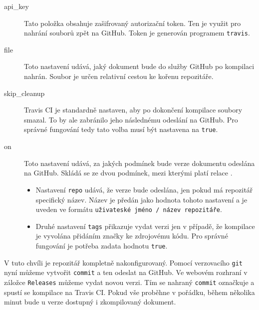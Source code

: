 \documentclass[a4paper]{article}
\begin{document}
\begin{description}
    \item[api\_key] Tato položka obsahuje zašifrovaný autorizační token.
    Ten je využit pro nahrání souborů zpět na GitHub.
    Token je generován programem \texttt{travis}.

    \item[file] Toto nastavení udává, jaký dokument bude do služby GitHub po kompilaci nahrán.
    Soubor je určen relativní cestou ke kořenu repozitáře.

    \item[skip\_cleanup] Travis CI je standardně nastaven, aby po dokončení kompilace soubory smazal.
    To by ale zabránilo jeho následnému odeslání na GitHub.
    Pro správné fungování tedy tato volba musí být nastavena na \texttt{true}.

    \item[on] Toto nastavení udává, za jakých podmínek bude verze dokumentu odeslána na GitHub.
    Skládá se ze dvou podmínek, mezi kterými platí relace .

    \begin{itemize}
        \item Nastavení \texttt{repo} udává, že verze bude odeslána, jen pokud má repozitář specifický název.
        Název je předán jako hodnota tohoto nastavení a je uveden ve formátu \texttt{uživateské jméno / název repozitáře}.
        \item Druhé nastavení \texttt{tags} přikazuje vydat verzi jen v případě, že kompilace je vyvolána přidáním značky ke zdrojovému kódu.
        Pro správné fungování je potřeba zadata hodnotu \texttt{true}.
    \end{itemize}
\end{description}

V tuto chvíli je repozitář kompletně nakonfigurovaný.
Pomocí verzovacího \texttt{git} nyní můžeme vytvořit \texttt{commit} a ten odeslat na GitHub.
Ve webovém rozhraní v záložce \texttt{Releases} můžeme vydat novou verzi.
Tím se nahraný \texttt{commit} označkuje a spustí se kompilace na Travis CI.
Pokud vše proběhne v pořádku, během několika minut bude u verze dostupný i zkompilovaný dokument.
\end{document}

